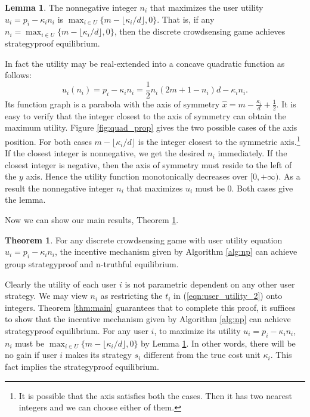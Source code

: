 \documentclass[conference]{IEEEtran}
\theoremstyle{definition}
\newtheorem{theorem}{Theorem}
\newtheorem{lemma}{Lemma}
\begin{document}
{\begin{lemma}
\label{lem:quadratic}
The nonnegative integer $n_i$ that maximizes the user utility $u_i = p_i - \kappa_in_i$ is $\max_{i\in U} \{m-\lfloor \kappa_i/d \rfloor, 0\}$.
{\color{blue} That is, if any $n_i = \max_{i\in U} \{m-\lfloor \kappa_i/d \rfloor, 0\}$, then the discrete crowdsensing game achieves strategyproof equilibrium. }
\end{lemma}
\begin{IEEEproof}
In fact the utility may be real-extended into a concave quadratic function as follows:
\[ u_i(n_i) = p_i - \kappa_in_i = \frac{1}{2}n_i(2m+1-n_i)d - \kappa_in_i. \]
Its function graph is a parabola with the axis of symmetry $\hat{x}=m-\frac{\kappa_i}{d}+\frac{1}{2}$. It is easy to verify that the integer closest to the axis of symmetry can obtain the maximum utility. Figure \ref{fig:quad_prop} gives the two possible cases of the axis position. For both cases $m-\lfloor \kappa_i/d \rfloor$ is the integer closest to the symmetric axis.\footnote{It is possible that the axis satisfies both the cases. Then it has two nearest integers and we can choose either of them.} If the closest integer is nonnegative, we get the desired $n_i$ immediately. If the closest integer is negative, then the axis of symmetry must reside to the left of the $y$ axis. Hence the utility function monotonically decreases over $[0,+\infty)$. As a result the nonnegative integer $n_i$ that maximizes $u_i$ must be 0. Both cases give the lemma.
\end{IEEEproof}

Now we can show our main results, Theorem \ref{thm:discrete}.
\begin{theorem}
\label{thm:discrete}
For any discrete crowdsensing game with user utility equation $u_i = p_i - \kappa_in_i$, the incentive mechanism given by Algorithm \ref{alg:np} can achieve group strategyproof and n-truthful equilibrium.
\end{theorem}
\begin{IEEEproof}
Clearly the utility of each user $i$ is not parametric dependent on any other user strategy. We may view $n_i$ as restricting the $t_i$ in (\ref{eqn:user_utility_2}) onto integers. %
Theorem \ref{thm:main} guarantees that to complete this proof, it suffices to show that the incentive mechanism given by Algorithm \ref{alg:np} can achieve strategyproof equilibrium. For any user $i$, to maximize its utility $u_i = p_i - \kappa_in_i$, $n_i$ must be $\max_{i\in U}\{m-\lfloor \kappa_i/d \rfloor, 0\}$ by Lemma \ref{lem:quadratic}. In other words, there will be no gain if user $i$ makes its strategy $s_i$ different from the true cost unit $\kappa_i$. This fact implies the strategyproof equilibrium.
\end{IEEEproof}
}
\end{document}
